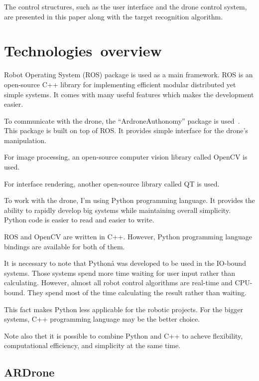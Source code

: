 \documentclass[12pt]{article}
\begin{document}
    The control structures, such as the user interface and
    the drone control system, are presented in this paper along with the
    target recognition algorithm.


    \section{Technologies~overview}

    Robot Operating System (ROS) package is used as a main framework.
    ROS is an open-source C++ library for implementing efficient modular
    distributed yet simple systems. It comes with many useful
    features which makes the development easier.

    To communicate with the drone, the ``ArdroneAuthonomy''
    package is used~\cite{ArdroneAuthonomy}.
    This package is built on top of ROS. It provides simple interface for
    the drone's manipulation.

    For image processing, an open-source computer vision library called OpenCV is used.

    For interface rendering, another open-source library called QT is used.
    
    To work with the drone, I'm using Python programming language.
    It provides the ability to rapidly develop big systems while maintaining
    overall simplicity. Python code is easier to read and easier to write.

    ROS and OpenCV are written in C++. However, Python programming language
    bindings are available for both of them.

    It is necessary to note that Pythonå
    was developed to be used in the IO-bound systems.
    Those systems spend more time waiting for user input rather than calculating.
    However, almost all robot control algorithms are real-time and CPU-bound.
    They spend most of the time calculating the result rather than waiting.

    This fact makes Python less applicable for the robotic projects.
    For the bigger systems, C++ programming language may be the better choice.
    
    Note also thet it is possible to combine Python and C++ to acheve flexibility,
    computational efficiency, and simplicity at the same time.


    \subsection{ARDrone}
\end{document}
